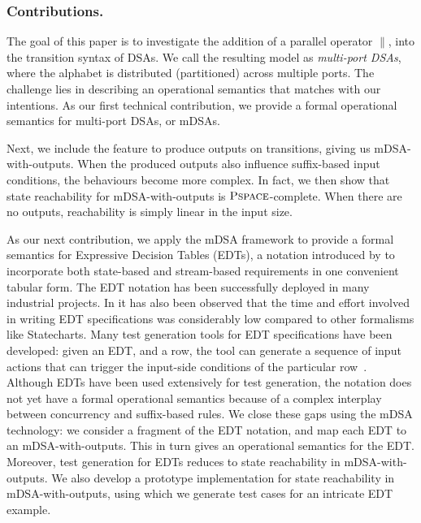   \subsubsection*{Contributions.} The goal of this paper is to investigate the
  addition of a parallel operator $\parallel$, into the
  transition syntax of DSAs. We call the resulting model as \emph{multi-port
  DSAs}, where the alphabet is distributed (partitioned) across multiple ports.
  The challenge lies in describing an operational semantics that matches with
  our intentions. As our first technical contribution, we provide a formal
  operational semantics for multi-port DSAs, or mDSAs.
  
  Next, we include the feature to produce outputs on transitions, giving us mDSA-with-outputs. When the produced outputs also influence suffix-based input conditions, the behaviours become more complex. In fact, we then show that state reachability for mDSA-with-outputs is $\operatorname{\textsc{Pspace}}$-complete. When there are no outputs, reachability is simply linear in the input size.  

  As our next contribution, we apply the mDSA framework to provide a formal semantics for Expressive Decision Tables (EDTs), a notation introduced by \cite{DBLP:conf/date/VenkateshSKA14} to incorporate both state-based and stream-based requirements in one convenient tabular form. The EDT notation has been successfully deployed in many industrial projects. In \cite{DBLP:conf/date/VenkateshSKA14} it has also been observed that the time and effort involved in writing EDT specifications was considerably low compared to other formalisms like  Statecharts. Many test generation tools for EDT specifications have been developed: given an EDT, and a row, the tool can generate a sequence of input actions that can trigger the input-side conditions of the particular row~\cite{DBLP:conf/enase/VenkateshSZA15a,DBLP:conf/icst/AgrawalVSZV20}. 
  Although EDTs have been used extensively for test generation, the notation does not yet have a formal operational semantics because of a complex interplay between concurrency and suffix-based rules. We close these gaps using the mDSA technology: we consider a fragment of the EDT notation, and map each EDT to an mDSA-with-outputs. This in turn gives an operational semantics for the EDT. Moreover, test generation for EDTs reduces to state reachability in mDSA-with-outputs. We also develop a prototype implementation for state reachability in mDSA-with-outputs, using which we generate test cases for an intricate EDT example. 
  
  
  
  

  

  
